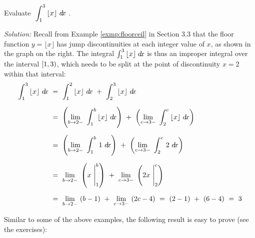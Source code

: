 \begin{exmp}\label{exmp:improper8}
\noindent Evaluate $~\displaystyle\int_{1}^{3}\,\lfloor x \rfloor~d\!x~$.\vspace{1mm}
\par\noindent\emph{Solution:} Recall from Example \ref{exmp:floorceil} in
Section 3.3 that the floor function $y=\lfloor x \rfloor$ has jump
discontinuities at each integer value of $x$, as shown in the graph on the
right. The integral $\int_{1}^{3}\,\lfloor x \rfloor\;d\!x$ is thus an improper
integral over the interval $\lbrack 1,3 )$, which needs to be split at the point
of discontinuity $x=2$ within that interval:
\begin{align*}
\int_{1}^{3}\,\lfloor x \rfloor~d\!x ~&=~ \int_{1}^{2}\,\lfloor x \rfloor~d\!x ~+~
\int_{2}^{3}\,\lfloor x \rfloor~d\!x\\[6pt]
&=~ \left(\lim_{b \to 2-}~\int_{1}^{b}\,\lfloor x \rfloor~d\!x\right) ~+~
    \left(\lim_{c \to 3-}~\int_{2}^{c}\,\lfloor x \rfloor~d\!x\right)\\[6pt]
&=~ \left(\lim_{b \to 2-}~\int_{1}^{b}\,1~d\!x\right) ~+~
    \left(\lim_{c \to 3-}~\int_{2}^{c}\,2~d\!x\right)\\[6pt]
&=~ \lim_{b \to 2-}~\left(x~\Biggr|_1^{b}\right) ~+~
    \lim_{c \to 3-}~\left(2x~\Biggr|_2^{c}\right)\\[6pt]
&=~ \lim_{b \to 2-}~(b - 1) ~+~ \lim_{c \to 3-}~(2c - 4) ~=~ (2-1) ~+~ (6-4) ~=~ 3
\end{align*}
\end{exmp}
\divider
\vspace{2mm}
Similar to some of the above examples, the following result is easy to prove
(see the exercises):

